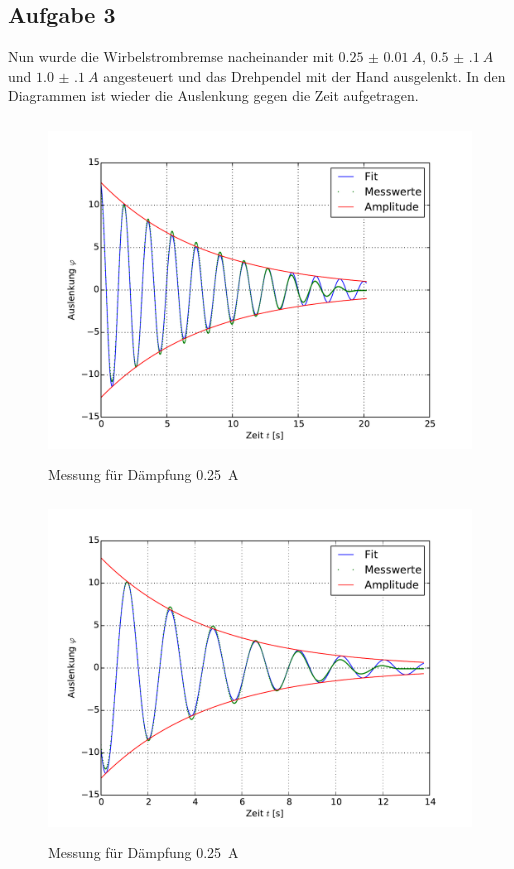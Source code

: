 \subsection{Aufgabe 3}
Nun wurde die Wirbelstrombremse nacheinander mit $\SI{0.25(1)}{A}$,  $\SI{0.5(1)}{A}$ und $\SI{1.0(1)}{A}$ angesteuert und das Drehpendel mit der Hand ausgelenkt. In den Diagrammen ist wieder die Auslenkung gegen die Zeit aufgetragen.
\begin{figure}[H]
  \centering
  \includegraphics[height=9cm, width=15cm]{computerdaten/Auswertung/3)250mA}
  \caption{Messung für Dämpfung \SI{0.25}{A}}
  \label{fig:3_250}
\end{figure}
\begin{figure}[H]
  \centering
  \includegraphics[height=9cm, width=15cm]{computerdaten/Auswertung/3)500mA}
  \caption{Messung für Dämpfung \SI{0.25}{A}}
  \label{fig:3_500}
\end{figure}

